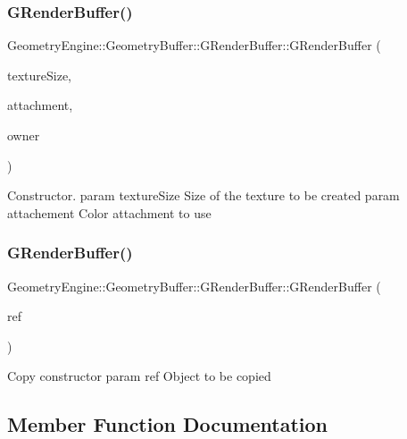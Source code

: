 \subsubsection{\texorpdfstring{GRenderBuffer()}{GRenderBuffer()}\hspace{0.1cm}{\footnotesize\ttfamily [2/3]}}
{\footnotesize\ttfamily Geometry\+Engine\+::\+Geometry\+Buffer\+::\+G\+Render\+Buffer\+::\+G\+Render\+Buffer (\begin{DoxyParamCaption}\item[{const Q\+Vector2D \&}]{texture\+Size,  }\item[{G\+Framebuffer\+Commons\+::\+G\+\_\+\+C\+O\+L\+O\+R\+\_\+\+A\+T\+T\+A\+C\+H\+M\+E\+N\+TS}]{attachment,  }\item[{const \mbox{\hyperlink{class_geometry_engine_1_1_geometry_buffer_1_1_g_framebuffer_object}{G\+Framebuffer\+Object}} $\ast$}]{owner }\end{DoxyParamCaption})}

Constructor. param texture\+Size Size of the texture to be created param attachement Color attachment to use \mbox{\label{class_geometry_engine_1_1_geometry_buffer_1_1_g_render_buffer_ac2ea09ec4bd5f76a51f33978196aa6f8}} 
\subsubsection{\texorpdfstring{GRenderBuffer()}{GRenderBuffer()}\hspace{0.1cm}{\footnotesize\ttfamily [3/3]}}
{\footnotesize\ttfamily Geometry\+Engine\+::\+Geometry\+Buffer\+::\+G\+Render\+Buffer\+::\+G\+Render\+Buffer (\begin{DoxyParamCaption}\item[{const \mbox{\hyperlink{class_geometry_engine_1_1_geometry_buffer_1_1_g_render_buffer}{G\+Render\+Buffer}} \&}]{ref }\end{DoxyParamCaption})}

Copy constructor param ref Object to be copied 

\subsection{Member Function Documentation}
\mbox{\label{class_geometry_engine_1_1_geometry_buffer_1_1_g_render_buffer_a451303386c519d70d50875873dc7b1fc}} 
